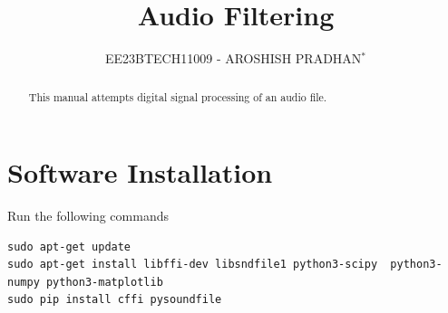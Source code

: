 \documentclass[journal,12pt,twocolumn]{IEEEtran}
\theoremstyle{remark}
\numberwithin{equation}{subsection}
\begin{document}





\renewcommand{\thefigure}{\theproblem.\arabic{figure}}
\renewcommand{\thefigure}{\theproblem}




\vspace{3cm}

\title{Audio Filtering}

\author{EE23BTECH11009 - AROSHISH PRADHAN$^{*}$}

\maketitle

\tableofcontents

\renewcommand{\thefigure}{\theenumi}
\renewcommand{\thetable}{\theenumi}
\bigskip

\begin{abstract}
This manual attempts digital signal processing of an audio file.
\end{abstract}

\section{Software Installation}
Run the following commands
\begin{lstlisting}
sudo apt-get update
sudo apt-get install libffi-dev libsndfile1 python3-scipy  python3-numpy python3-matplotlib 
sudo pip install cffi pysoundfile 
\end{lstlisting}
\end{document}
